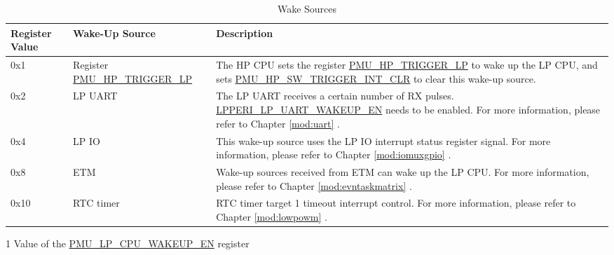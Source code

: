 \documentclass[main\_\_EN.tex]{subfiles}
\begin{document}
    \begin{table}[H]
    \centering
    \caption{Wake Sources}
    \label{tab:ulp-wake-sources}
    \begin{threeparttable}
    \begin{tabular}{| l | l | m{7cm}|}
    \hline
    \rowcolor{lightgray}
    Register Value \tnote{1} & Wake-Up Source & Description  \\\hline

    0x1 & Register \hyperref[fielddesc:PMUHPTRIGGERLP]{PMU\_HP\_TRIGGER\_LP} & The HP CPU sets the register \hyperref[fielddesc:PMUHPTRIGGERLP]{PMU\_HP\_TRIGGER\_LP} to wake up the LP CPU, and sets \hyperref[fielddesc:PMUHPSWTRIGGERINTCLR]{PMU\_HP\_SW\_TRIGGER\_INT\_CLR} to clear this wake-up source.\\\hline
    0x2 & LP UART & The LP UART receives a certain number of RX pulses. \hyperref[fielddesc:LPPERILPUARTWAKEUPEN]{LPPERI\_LP\_UART\_WAKEUP\_EN} needs to be enabled. For more information, please refer to Chapter \ref{mod:uart} \textit{\nameref{mod:uart}}. \\\hline
    0x4 & LP IO & This wake-up source uses the LP IO interrupt status register signal. For more information, please refer to Chapter \ref{mod:iomuxgpio} \textit{\nameref{mod:iomuxgpio}}. \\\hline
    0x8 & ETM & Wake-up sources received from ETM can wake up the LP CPU. For more information, please refer to Chapter \ref{mod:evntaskmatrix} \textit{\nameref{mod:evntaskmatrix}}. \\\hline
    0x10 & RTC timer & RTC timer target 1 timeout interrupt control. For more information, please refer to Chapter \ref{mod:lowpowm} \textit{\nameref{mod:lowpowm}}. \\\hline
\end{tabular}
    \begin{tablenotes}
        \item[1] Value of the \hyperref[fielddesc:PMULPCPUWAKEUPEN]{PMU\_LP\_CPU\_WAKEUP\_EN} register
    \end{tablenotes}
    \end{threeparttable}
\end{table}
\end{document}
